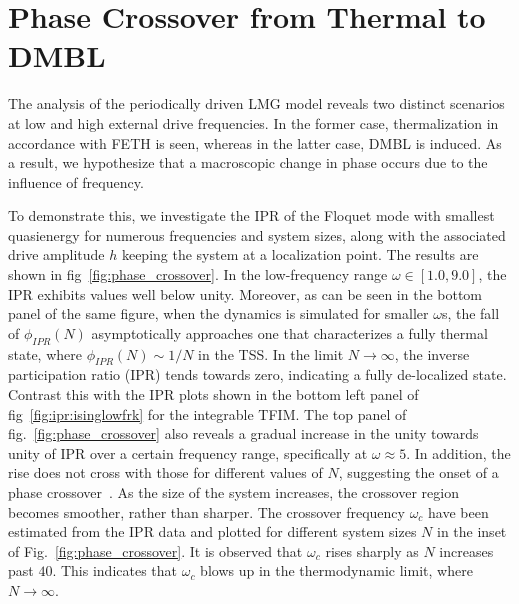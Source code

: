 \documentclass[%
reprint,
superscriptaddress,
amsmath,amssymb,
aps,
prb,
showkeys,
]{revtex4-2}
\begin{document}
	\section{\label{sec:level5}Phase Crossover from Thermal to DMBL}
	The analysis of the periodically driven LMG model reveals two distinct scenarios at low and high external drive frequencies. In the former case, thermalization in accordance with FETH is seen, whereas in the latter case, DMBL is induced. As a result, we hypothesize that a macroscopic change in phase occurs due to the influence of frequency. 
	
	To demonstrate this, we investigate the IPR of the  Floquet mode with smallest quasienergy
	for numerous frequencies and system sizes, along with the associated drive amplitude $h$ keeping the system at a localization point. The results are shown in fig~\ref{fig:phase_crossover}. In the low-frequency range $\omega \in \left[1.0, 9.0\right]$, the IPR exhibits values well below unity.   {Moreover, as can be seen in the bottom panel of the same figure, when the dynamics is simulated for smaller} $\omega$s, {the fall of} $\phi_{IPR}(N)$ {asymptotically approaches one that characterizes a fully thermal state, where} $\phi_{IPR}(N)\sim 1/N$ {in the TSS. } In the limit  $N\rightarrow\infty$, the inverse participation ratio (IPR) tends towards zero, indicating a fully de-localized state.  {Contrast this with the IPR plots shown in the bottom left panel of fig}~\ref{fig:ipr:isinglowfrk} {for the integrable TFIM}.  {The top panel of fig.}~\ref{fig:phase_crossover} {also reveals} a gradual increase {in the unity} {towards unity} of IPR over a certain frequency range, specifically at $\omega \approx 5$. In addition, the rise does not cross with those for different values of $N$, suggesting the onset of a phase crossover~\cite{sierant_2023, sachdev_quantum_2011}. As the size of the system increases, the crossover region becomes smoother, rather than sharper.  The crossover frequency $\omega_c$ have been estimated from the IPR data and plotted for different system sizes $N$ in the inset of Fig.~\ref{fig:phase_crossover}. It is observed that $\omega_c$ rises sharply as $N$ increases past $40$. This indicates that $\omega_c$ blows up in the thermodynamic limit, where $N \to \infty$.
\end{document}
